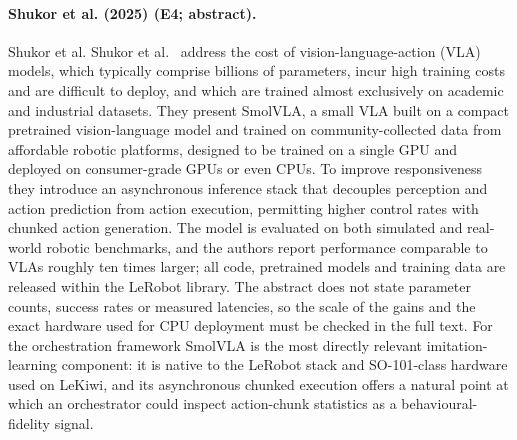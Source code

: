 \documentclass[10pt,a4paper]{article}
\begin{document}
\paragraph{Shukor et al. (2025) (E4; abstract).} Shukor et al. Shukor et al.~\cite{Shukor2025} address the cost of vision-language-action (VLA) models, which typically comprise billions of parameters, incur high training costs and are difficult to deploy, and which are trained almost exclusively on academic and industrial datasets. They present SmolVLA, a small VLA built on a compact pretrained vision-language model and trained on community-collected data from affordable robotic platforms, designed to be trained on a single GPU and deployed on consumer-grade GPUs or even CPUs. To improve responsiveness they introduce an asynchronous inference stack that decouples perception and action prediction from action execution, permitting higher control rates with chunked action generation. The model is evaluated on both simulated and real-world robotic benchmarks, and the authors report performance comparable to VLAs roughly ten times larger; all code, pretrained models and training data are released within the LeRobot library. The abstract does not state parameter counts, success rates or measured latencies, so the scale of the gains and the exact hardware used for CPU deployment must be checked in the full text. For the orchestration framework SmolVLA is the most directly relevant imitation-learning component: it is native to the LeRobot stack and SO-101-class hardware used on LeKiwi, and its asynchronous chunked execution offers a natural point at which an orchestrator could inspect action-chunk statistics as a behavioural-fidelity signal.
\end{document}
